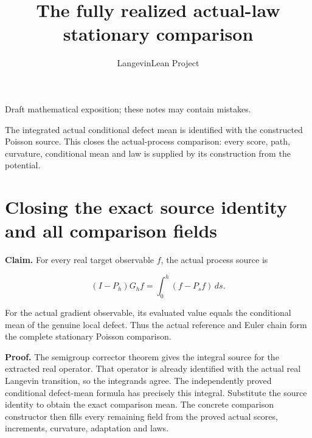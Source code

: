 \documentclass[11pt,a4paper]{article}
\title{\texorpdfstring{The fully realized actual-law stationary comparison}{The fully realized actual-law stationary comparison}}
\author{LangevinLean Project}
\date{}
\begin{document}
\maketitle
Draft mathematical exposition; these notes may contain mistakes.


The integrated actual conditional defect mean is identified with the constructed Poisson source. This closes the actual-process comparison: every score, path, curvature, conditional mean and law is supplied by its construction from the potential.


\section{\texorpdfstring{Closing the exact source identity and all comparison fields}{Closing the exact source identity and all comparison fields}}


\textbf{Claim.} For every real target observable \(f\), the actual process source is

\[(I-P_h)G_hf=\int_0^h(f-P_sf)\,ds.\]

For the actual gradient observable, its evaluated value equals the conditional mean of the genuine local defect. Thus the actual reference and Euler chain form the complete stationary Poisson comparison.



\textbf{Proof.} The semigroup corrector theorem gives the integral source for the extracted real operator. That operator is already identified with the actual real Langevin transition, so the integrands agree. The independently proved conditional defect-mean formula has precisely this integral. Substitute the source identity to obtain the exact comparison mean. The concrete comparison constructor then fills every remaining field from the proved actual scores, increments, curvature, adaptation and laws.
\end{document}
